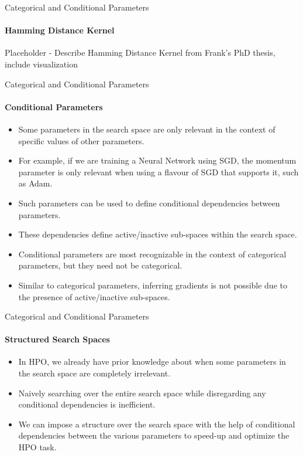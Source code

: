 \begin{frame}[c]{Categorical and Conditional Parameters}
\framesubtitle{Hamming Distance Kernel}
\begin{center}
Placeholder - Describe Hamming Distance Kernel from Frank's PhD thesis, include visualization
\end{center}
\end{frame}
\begin{frame}[c]{Categorical and Conditional Parameters}
\framesubtitle{Conditional Parameters}
\pause
\begin{itemize}
    \item<+-> Some parameters in the search space are only relevant in the context of specific values of other parameters.
    \item<+-> For example, if we are training a Neural Network using SGD, the momentum parameter is only relevant when using a flavour of SGD that supports it, such as Adam.
    \item<+-> Such parameters can be used to define conditional dependencies between parameters.
    \item<+-> These dependencies define active/inactive sub-spaces within the search space.
    \item<+-> Conditional parameters are most recognizable in the context of categorical parameters, but they need not be categorical.
    \item<+-> Similar to categorical parameters, inferring gradients is not possible due to the presence of active/inactive sub-spaces.
\end{itemize}
\end{frame}
\begin{frame}[c]{Categorical and Conditional Parameters}
\framesubtitle{Structured Search Spaces}
\pause
\begin{itemize}
    \item<+-> In HPO, we already have prior knowledge about when some parameters in the search space are completely irrelevant.
    \item<+-> Naively searching over the entire search space while disregarding any conditional dependencies is inefficient.
    \item<+-> We can impose a structure over the search space with the help of conditional dependencies between the various parameters to speed-up and optimize the HPO task.
\end{itemize}
\end{frame}
